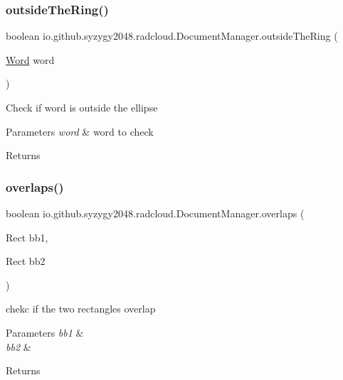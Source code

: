 \subsubsection{\texorpdfstring{outside\+The\+Ring()}{outsideTheRing()}}
{\footnotesize\ttfamily boolean io.\+github.\+syzygy2048.\+radcloud.\+Document\+Manager.\+outside\+The\+Ring (\begin{DoxyParamCaption}\item[{\mbox{\hyperlink{classio_1_1github_1_1syzygy2048_1_1radcloud_1_1_word}{Word}}}]{word }\end{DoxyParamCaption})\hspace{0.3cm}{\ttfamily [private]}}

Check if word is outside the ellipse 
\begin{DoxyParams}{Parameters}
{\em word} & word to check \\
\hline
\end{DoxyParams}
\begin{DoxyReturn}{Returns}

\end{DoxyReturn}
\mbox{\label{classio_1_1github_1_1syzygy2048_1_1radcloud_1_1_document_manager_acf53af046d9fbe0df0dd1c062a2c2398}} 
\subsubsection{\texorpdfstring{overlaps()}{overlaps()}}
{\footnotesize\ttfamily boolean io.\+github.\+syzygy2048.\+radcloud.\+Document\+Manager.\+overlaps (\begin{DoxyParamCaption}\item[{Rect}]{bb1,  }\item[{Rect}]{bb2 }\end{DoxyParamCaption})\hspace{0.3cm}{\ttfamily [private]}}

chekc if the two rectangles overlap 
\begin{DoxyParams}{Parameters}
{\em bb1} & \\
\hline
{\em bb2} & \\
\hline
\end{DoxyParams}
\begin{DoxyReturn}{Returns}

\end{DoxyReturn}
\mbox{\label{classio_1_1github_1_1syzygy2048_1_1radcloud_1_1_document_manager_a00bcd6e86e3cd7b82122d06c09135963}} 
